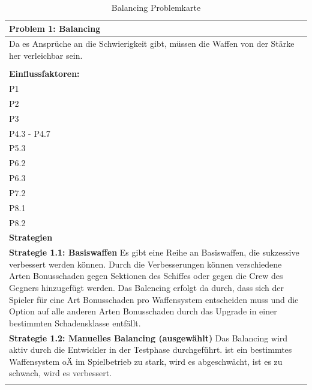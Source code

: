 \documentclass[fontsize=12pt,paper=a4,twoside]{scrartcl}
\begin{document}
\begin{table}[H]
    \centering
    \begin{tabular}{|p{15cm}|}
    \hline
          \textbf{Problem 1: Balancing}  \\ \hline
	Da es Ansprüche an die Schwierigkeit gibt, müssen die Waffen von der Stärke her verleichbar sein. \\
         \\ \hline
          \textbf{Einflussfaktoren: } \\
	P1 \\
	P2 \\
	P3 \\
	P4.3 - P4.7 \\
	P5.3 \\
	P6.2 \\
	P6.3 \\
	P7.2 \\
	P8.1 \\
	P8.2 \\
          \hline
          \textbf{Strategien} \\ \hline
            {}          
           \label{strategie:1.1}     
          \textbf{Strategie 1.1: Basiswaffen} Es gibt eine Reihe an Basiswaffen, die sukzessive verbessert werden können. Durch die Verbesserungen können verschiedene Arten Bonusschaden gegen Sektionen des Schiffes oder gegen die Crew des Gegners hinzugefügt werden. Das Balencing erfolgt da durch, dass sich der Spieler für eine Art Bonusschaden pro Waffensystem entscheiden muss und die Option auf alle anderen Arten Bonusschaden durch das Upgrade in einer bestimmten Schadensklasse entfällt. \\        
  {}          
           \label{strategie:1.2}              
          \textbf{Strategie 1.2: Manuelles Balancing (ausgewählt)} Das Balancing wird aktiv durch die Entwickler in der Testphase durchgeführt. ist ein bestimmtes Waffensystem oÄ im Spielbetrieb zu stark, wird es abgeschwächt, ist es zu schwach, wird es verbessert.  \\
	 \\ \hline
    \end{tabular}

    \caption{Balancing Problemkarte}
    \label{tab:ProblemKarte1}
\end{table}
\end{document}
